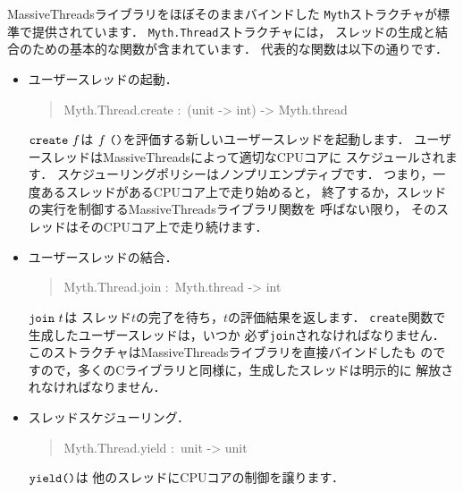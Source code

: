 \documentclass{jbook}
\newenvironment{program}{\begin{quote}\begin{tt}}%
                        {\end{tt}\end{quote}}
\begin{document}
	MassiveThreadsライブラリをほぼそのままバインドした
{\tt Myth}ストラクチャが標準で提供されています．
	{\tt Myth.Thread}ストラクチャには，
スレッドの生成と結合のための基本的な関数が含まれています．
	代表的な関数は以下の通りです．
\begin{itemize}
\item
	ユーザースレッドの起動．
\begin{program}
Myth.Thread.create :\ (unit -> int) -> Myth.thread
\end{program}
	$\mbox{\tt create}\ f$は
$f\ \mbox{\tt ()}$を評価する新しいユーザースレッドを起動します．
	ユーザースレッドはMassiveThreadsによって適切なCPUコアに
スケジュールされます．
	スケジューリングポリシーはノンプリエンプティブです．
	つまり，一度あるスレッドがあるCPUコア上で走り始めると，
終了するか，スレッドの実行を制御するMassiveThreadsライブラリ関数を
呼ばない限り，
そのスレッドはそのCPUコア上で走り続けます．
\item
	ユーザースレッドの結合．
\begin{program}
Myth.Thread.join :\ Myth.thread -> int
\end{program}
	$\mbox{\tt join}\ t$は
スレッド$t$の完了を待ち，$t$の評価結果を返します．
	{\tt create}関数で生成したユーザースレッドは，いつか
必ず{\tt join}されなければなりません．
	このストラクチャはMassiveThreadsライブラリを直接バインドしたも
のですので，多くのCライブラリと同様に，生成したスレッドは明示的に
解放されなければなりません．
\item
	スレッドスケジューリング．
\begin{program}
Myth.Thread.yield :\ unit -> unit
\end{program}
	$\mbox{\tt yield} \mbox{\tt ()}$は
他のスレッドにCPUコアの制御を譲ります．
\end{itemize}
\end{document}

